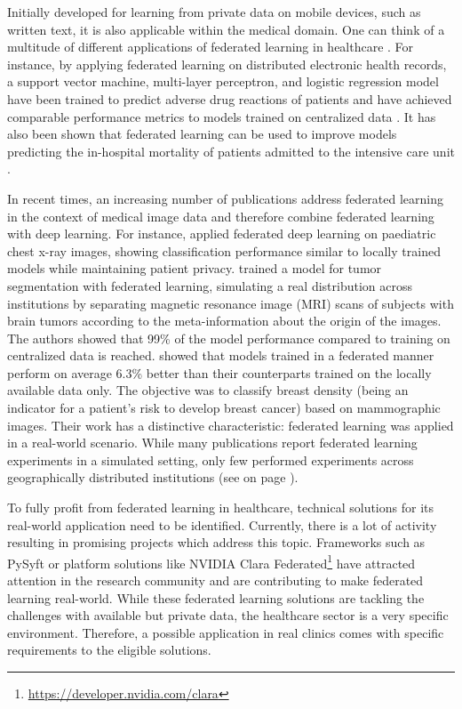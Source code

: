 Initially developed for learning from private data on mobile devices, such as written text, it is also applicable within the medical domain. One can think of a multitude of different applications of federated learning in healthcare \citep{Xu2021}. For instance, by applying federated learning on distributed electronic health records, a support vector machine, multi-layer perceptron, and logistic regression model have been trained to predict adverse drug reactions of patients and have achieved comparable performance metrics to models trained on centralized data \citep{Choudhury2019PredictingLearning}. It has also been shown that federated learning can be used to improve models predicting the in-hospital mortality of patients admitted to the intensive care unit \citep{Sharma2019PreservingMortality}.

In recent times, an increasing number of publications address federated learning in the context of medical image data and therefore combine federated learning with deep learning.
For instance, \cite{Kaissis2021End-to-endImaging} applied federated deep learning on paediatric chest x-ray images, showing classification performance similar to locally trained models while maintaining patient privacy.
\cite{Sheller2020FederatedData} trained a model for tumor segmentation with federated learning, simulating a real distribution across institutions by separating  magnetic resonance image (MRI) scans of subjects with brain tumors according to the meta-information about the origin of the images. The authors showed that 99\% of the model performance compared to training on centralized data is reached.
\cite{Roth2020FederatedImplementation} showed that models trained in a federated manner perform on average 6.3\% better than their counterparts trained on the locally available data only. The objective was to classify breast density (being an indicator for a patient's risk to develop breast cancer) based on mammographic images. Their work has a distinctive characteristic: federated learning was applied in a real-world scenario.
While many publications report federated learning experiments in a simulated setting, only few performed experiments across geographically distributed institutions (see  on page \pageref{subsec:LitRev}).

To fully profit from federated learning in healthcare, technical solutions for its real-world application need to be identified. Currently, there is a lot of activity resulting in promising projects which address this topic. Frameworks such as PySyft \citep{Ryffel2018ALearning} or platform solutions like NVIDIA Clara Federated\footnote{\url{https://developer.nvidia.com/clara}} have attracted attention in the research community and are contributing to make federated learning real-world. While these federated learning solutions are tackling the challenges with available but private data, the healthcare sector is a very specific environment. Therefore, a possible application in real clinics comes with specific requirements to the eligible solutions.

